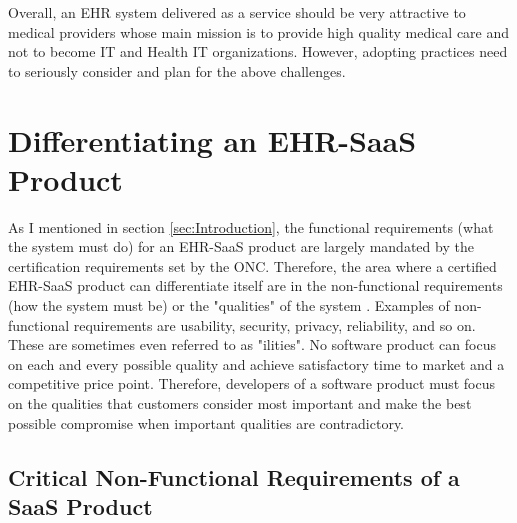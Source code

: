 \documentclass[10pt]{article}
\begin{document}
Overall, an EHR system delivered as a service should be very attractive to medical providers whose main mission is to provide high quality medical care and not to become IT and Health IT organizations.
However, adopting practices need to seriously consider and plan for the above challenges.

\section{Differentiating an EHR-SaaS Product}
\label{sec:Critical-EhrSaaS-Ilities}

As I mentioned in section \ref{sec:Introduction}, the functional requirements (what the system must do) for an EHR-SaaS product are largely mandated by the certification requirements set by the ONC.
Therefore, the area where a certified EHR-SaaS product can differentiate itself are in the non-functional requirements (how the system must be) or the "qualities" of the system \cite{wiki-nfr}.
Examples of non-functional requirements are usability, security, privacy, reliability, and so on.
These are sometimes even referred to as "ilities".
No software product can focus on each and every possible quality and achieve satisfactory time to market and a competitive price point.
Therefore, developers of a software product must focus on the qualities that customers consider most important and make the best possible compromise when important qualities are contradictory.


\subsection{Critical Non-Functional Requirements of a SaaS Product}
\label{sec:Critical-SaaS-Ilities}
\end{document}
